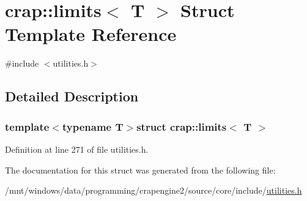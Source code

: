 \hypertarget{structcrap_1_1limits}{\section{crap\+:\+:limits$<$ T $>$ Struct Template Reference}
\label{structcrap_1_1limits}
}


{\ttfamily \#include $<$utilities.\+h$>$}



\subsection{Detailed Description}
\subsubsection*{template$<$typename T$>$struct crap\+::limits$<$ T $>$}



Definition at line 271 of file utilities.\+h.



The documentation for this struct was generated from the following file\+:\begin{DoxyCompactItemize}
\item 
/mnt/windows/data/programming/crapengine2/source/core/include/\hyperlink{utilities_8h}{utilities.\+h}\end{DoxyCompactItemize}
